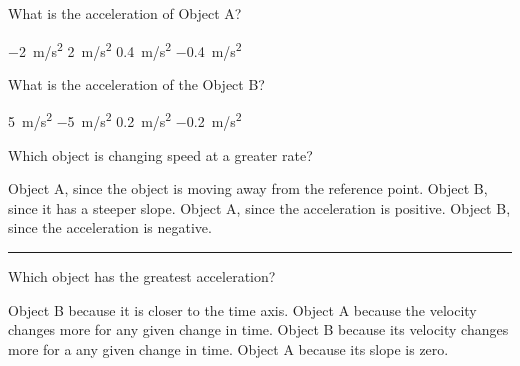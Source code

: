 \documentclass[../main-physics-problems.tex]{subfiles}
\begin{document}
\begin{questions}
\question \label{c1CMp}
What is the acceleration of Object A?

\begin{randomizechoices}
    \choice \SI{-2}{m/s^2}
    \correctchoice \SI{2}{m/s^2}
    \choice \SI{0.4}{m/s^2}
    \choice \SI{-0.4}{m/s^2}
\end{randomizechoices}

\question 
What is the acceleration of the Object B?

\begin{randomizechoices}
    \choice \SI{5}{m/s^2}
    \correctchoice \SI{-5}{m/s^2}
    \choice \SI{0.2}{m/s^2}
    \choice \SI{-0.2}{m/s^2}
\end{randomizechoices}

\question \label{uwahd}
Which object is changing speed at a greater rate?

\begin{randomizechoices}
    \choice Object A, since the object is moving away from the reference point.
    \correctchoice Object B, since it has a steeper slope.
    \choice Object A, since the acceleration is positive.
    \choice Object B, since the acceleration is negative.
\end{randomizechoices}

\bigskip
\hrule

\question
Which object has the greatest acceleration?

\begin{center}
\end{center}

\begin{randomizechoices}
    \choice Object B because it is closer to the time axis.
    \correctchoice Object A because the velocity changes more for any given change in time.
    \choice Object B because its velocity changes more for a any given change in time.
    \choice Object A because its slope is zero.
\end{randomizechoices}


\end{questions}
\end{document}
